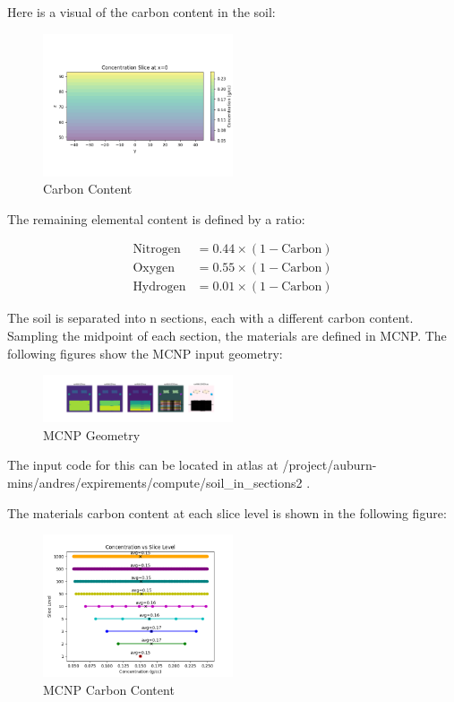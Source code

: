 \documentclass{article}
\begin{document}
Here is a visual of the carbon content in the soil:

\begin{figure}[h]
    \centering
    \includegraphics[width=0.5\textwidth]{imgs/carbon_content.png}
    \caption{Carbon Content}
\end{figure}

The remaining elemental content is defined by a ratio:

\[
\begin{align*}
    \text{Nitrogen} &= 0.44 \times (1-\text{Carbon}) \\
    \text{Oxygen} &= 0.55 \times (1-\text{Carbon}) \\
    \text{Hydrogen} &= 0.01 \times (1-\text{Carbon})
\end{align*}
\]

The soil is separated into n sections, each with a different carbon content. Sampling the midpoint of each section, the materials are defined in MCNP. The following figures show the MCNP input geometry:

\begin{figure}[h]
    \centering
    \includegraphics[width=0.5\textwidth]{imgs/mcnp_geometry.png}
    \caption{MCNP Geometry}
\end{figure}

The input code for this can be located in atlas at /project/auburn-mins/andres/expirements/compute/soil_in_sections2 .

The materials carbon content at each slice level is shown in the following figure:

\begin{figure}[h]
    \centering
    \includegraphics[width=0.5\textwidth]{imgs/mcnp_carbon_content.png}
    \caption{MCNP Carbon Content}
\end{figure}
\end{document}
